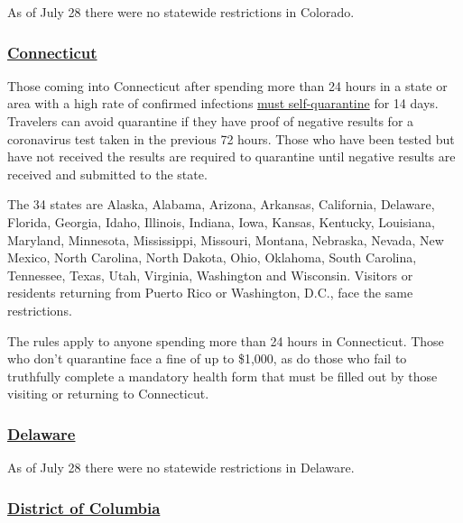 As of July 28 there were no statewide restrictions in Colorado.

\hypertarget{connecticut}{%
\subsubsection{\texorpdfstring{\href{https://portal.ct.gov/Coronavirus/Covid-19-Knowledge-Base/Travel-In-or-Out-of-CT}{Connecticut}}{Connecticut}}\label{connecticut}}

Those coming into Connecticut after spending more than 24 hours in a
state or area with a high rate of confirmed infections
\href{https://www.nytimes.com/2020/07/24/nyregion/coronavirus-test-results-nyc.html}{must
self-quarantine} for 14 days. Travelers can avoid quarantine if they
have proof of negative results for a coronavirus test taken in the
previous 72 hours. Those who have been tested but have not received the
results are required to quarantine until negative results are received
and submitted to the state.

The 34 states are Alaska, Alabama, Arizona, Arkansas, California,
Delaware, Florida, Georgia, Idaho, Illinois, Indiana, Iowa, Kansas,
Kentucky, Louisiana, Maryland, Minnesota, Mississippi, Missouri,
Montana, Nebraska, Nevada, New Mexico, North Carolina, North Dakota,
Ohio, Oklahoma, South Carolina, Tennessee, Texas, Utah, Virginia,
Washington and Wisconsin. Visitors or residents returning from Puerto
Rico or Washington, D.C., face the same restrictions.

The rules apply to anyone spending more than 24 hours in Connecticut.
Those who don't quarantine face a fine of up to \$1,000, as do those who
fail to truthfully complete a mandatory health form that must be filled
out by those visiting or returning to Connecticut.

\hypertarget{delaware}{%
\subsubsection{\texorpdfstring{\href{https://www.visitdelaware.com/industry/covid-19-in-delaware/}{Delaware}}{Delaware}}\label{delaware}}

As of July 28 there were no statewide restrictions in Delaware.

\hypertarget{district-of-columbia}{%
\subsubsection{\texorpdfstring{\href{https://washington.org/dc-information/coronavirus-travel-update-washington-dc}{District
of Columbia}}{District of Columbia}}\label{district-of-columbia}}

